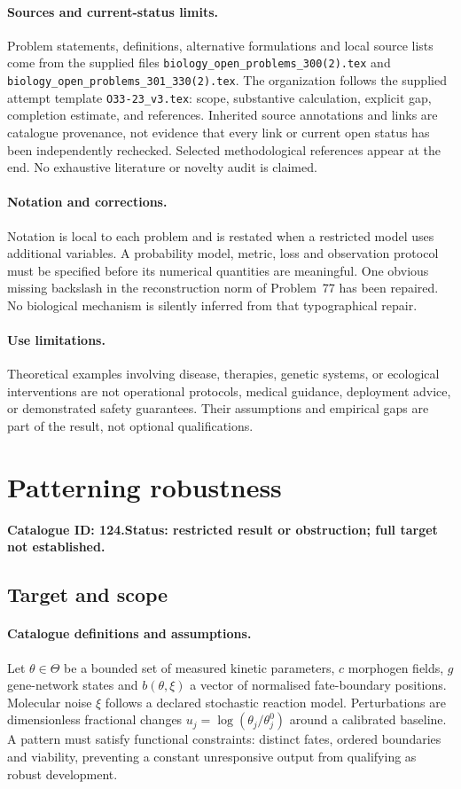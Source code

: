 \documentclass[11pt]{article}
\begin{document}
\paragraph{Sources and current-status limits.}
Problem statements, definitions, alternative formulations and local source lists
come from the supplied files
\texttt{biology\_open\_problems\_300(2).tex} and
\texttt{biology\_open\_problems\_301\_330(2).tex}.
The organization follows the supplied attempt template
\texttt{O33-23\_v3.tex}: scope, substantive calculation, explicit gap,
completion estimate, and references. Inherited source annotations and links are
catalogue provenance, not evidence that every link or current open status has
been independently rechecked. Selected methodological references appear at the
end. No exhaustive literature or novelty audit is claimed.

\paragraph{Notation and corrections.}
Notation is local to each problem and is restated when a restricted model uses
additional variables. A probability model, metric, loss and observation protocol
must be specified before its numerical quantities are meaningful. One obvious
missing backslash in the reconstruction norm of Problem~77 has been repaired.
No biological mechanism is silently inferred from that typographical repair.

\paragraph{Use limitations.}
Theoretical examples involving disease, therapies, genetic systems, or ecological
interventions are not operational protocols, medical guidance, deployment advice,
or demonstrated safety guarantees. Their assumptions and empirical gaps are part
of the result, not optional qualifications.

\setcounter{section}{123}
\section{Patterning robustness}
\label{prob:124}
\noindent\textbf{Catalogue ID: 124.}\quad \textbf{Status: restricted result or obstruction; full target not established.}
\subsection{Target and scope}
\paragraph{Catalogue definitions and assumptions.}
Let $\theta\in\Theta$ be a bounded set of measured kinetic parameters, $c$ morphogen fields, $g$ gene-network states and $b(\theta,\xi)$ a vector of normalised fate-boundary positions. Molecular noise $\xi$ follows a declared stochastic reaction model. Perturbations are dimensionless fractional changes $u_j=\log(\theta_j/\theta_j^0)$ around a calibrated baseline. A pattern must satisfy functional constraints: distinct fates, ordered boundaries and viability, preventing a constant unresponsive output from qualifying as robust development.
\end{document}
